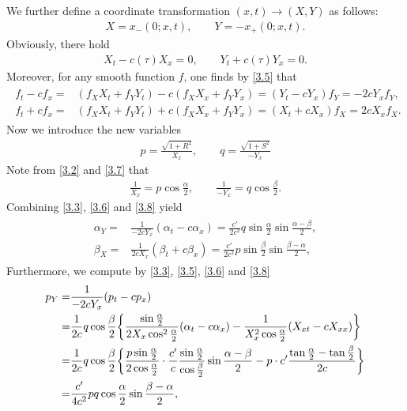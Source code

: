 \documentclass[11pt,reqno]{article}
\newcommand{\fr}{\frac}
\numberwithin{equation}{section}
\begin{document}
We further define a coordinate transformation $(x,t)\rightarrow(X,Y)$ as follows:
\begin{align}\label{3.4}
X=x_-(0;x,t),\qquad Y=-x_+(0;x,t).
\end{align}
Obviously, there hold
\begin{align}\label{3.5}
X_t-c(\tau)X_x=0,\qquad Y_t+c(\tau)Y_x=0.
\end{align}
Moreover, for any smooth function $f$, one finds by \eqref{3.5} that
\begin{align}\label{3.6}
\begin{split}
f_t-cf_x=&(f_XX_t+f_YY_t)-c(f_XX_x+f_YY_x)=(Y_t-cY_x)f_Y=-2cY_xf_Y,\\
f_t+cf_x=&(f_XX_t+f_YY_t)+c(f_XX_x+f_YY_x)=(X_t+cX_x)f_X=2cX_xf_X.
\end{split}
\end{align}
Now we introduce the new variables
\begin{align}\label{3.7}
p=\fr{\sqrt{1+R^2}}{X_x},\qquad q=\fr{\sqrt{1+S^2}}{-Y_x}
\end{align}
Note from \eqref{3.2} and \eqref{3.7} that
\begin{align}\label{3.8}
\fr{1}{X_x}=p\cos\fr{\alpha}{2},\qquad \fr{1}{-Y_x}=q\cos\fr{\beta}{2}.
\end{align}
Combining \eqref{3.3}, \eqref{3.6} and \eqref{3.8} yield
\begin{align}\label{3.9}
\begin{split}
\alpha_Y=&\fr{1}{-2cY_x}(\alpha_t-c\alpha_x)=\fr{c'}{2c^2}q\sin\fr{\alpha}{2} \sin\fr{\alpha-\beta}{2}, \\
\beta_X=&\fr{1}{2cX_x}(\beta_t+c\beta_x)=\fr{c'}{2c^2}p\sin\fr{\beta}{2}\sin\fr{\beta-\alpha}{2},
\end{split}
\end{align}
Furthermore, we compute by \eqref{3.3}, \eqref{3.5}, \eqref{3.6} and \eqref{3.8}
\begin{align}\label{3.10}
p_Y=&\fr{1}{-2cY_x}(p_t-cp_x) \notag \\ =&\fr{1}{2c}q\cos\fr{\beta}{2}\bigg\{\fr{\sin\fr{\alpha}{2}}{2X_x\cos^2\fr{\alpha}{2}} (\alpha_t-c\alpha_x) -\fr{1}{X_{x}^2\cos\fr{\alpha}{2}}(X_{xt}-cX_{xx})\bigg\}
\notag \\ =&\fr{1}{2c}q\cos\fr{\beta}{2} \bigg\{\fr{p\sin\fr{\alpha}{2}}{2\cos\fr{\alpha}{2}} \cdot\fr{c'}{c}\fr{\sin\fr{\alpha}{2}}{\cos\fr{\beta}{2}}\sin\fr{\alpha-\beta}{2} -p\cdot c'\fr{\tan\fr{\alpha}{2}-\tan\fr{\beta}{2}}{2c}\bigg\} \notag \\
=&\fr{c'}{4c^2}pq\cos\fr{\alpha}{2}\sin\fr{\beta-\alpha}{2},
\end{align}
\end{document}
